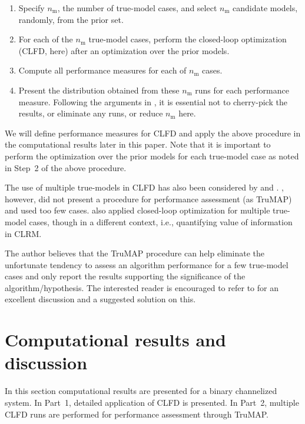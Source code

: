 \documentclass[11pt]{article}
\begin{document}
\begin{enumerate}
\item Specify $n_{\text{m}}$, the number of true-model cases, and select $n_{\text{m}}$ candidate models, randomly, from the prior set.
\item For each of the $n_{\text{m}}$ true-model cases, perform the closed-loop optimization (CLFD, here) after an optimization over the prior models.
\item Compute all performance measures for each of $n_{\text{m}}$ cases.
\item Present the distribution obtained from these $n_{\text{m}}$ runs for each performance measure.
Following the arguments in \citet{simmons:11}, it is essential not to cherry-pick the results, or eliminate any runs, or reduce $n_{\text{m}}$ here.
\end{enumerate}

We will define performance measures for CLFD and apply the above procedure in the computational results later in this paper.
Note that it is important to
perform the optimization over the prior models for each true-model case as noted in Step~2 of the above procedure.


The use of multiple true-models in CLFD has also been considered by \citet{hanea:17} and \citet{shirangi:15b}.
\citet{hanea:17}, however, did not present a procedure for performance assessment (as TruMAP) and used too few cases.
\citet{barros:16} also applied closed-loop optimization for multiple true-model cases,
though in a different context, i.e., quantifying value of information in CLRM.

The author believes that the TruMAP procedure can help eliminate the unfortunate tendency to
assess an algorithm performance for a few true-model cases and only report the results supporting the significance of the algorithm/hypothesis.
The interested reader is encouraged to refer to \citet{simmons:11} for an excellent discussion and a suggested solution on this.

\section{Computational results and discussion} \label{Ex4}
In this section computational results are presented for a binary channelized system.
In Part~1, detailed application of CLFD is presented.
In Part~2, multiple CLFD runs are performed for performance assessment through TruMAP.
\end{document}

